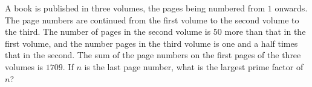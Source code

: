 A book is published in three volumes, the pages being numbered from $1$ onwards. The page numbers are continued from the first volume to the second volume to the third. The number of pages in the second volume is $50$ more than that in the first volume, and the number pages in the third volume is one and a half times that in the second. The sum of the page numbers on the first pages of the three volumes is $1709$. If $n$ is the last page number, what is the largest prime factor of $n$?
